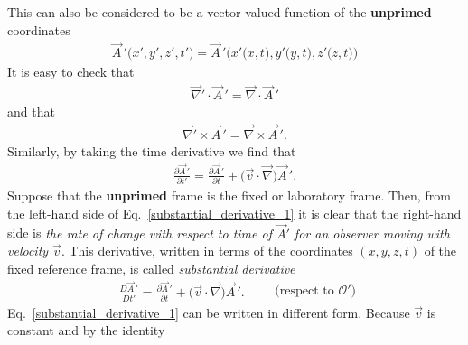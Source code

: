 \documentclass[12pt,a4paper,oneside]{book}
\begin{document}
\begin{onehalfspace}
This can also be considered to be a vector-valued function of the 
\textbf{unprimed} coordinates
\begin{equation*}
	\begin{aligned}
		\vec{A}\,'\big(x',y',z',t'\big) = 	
		\vec{A}\,'\big(x'\big(x,t\big),y'\big(y,t\big),z'\big(z,t\big)\big)
	\end{aligned}
\end{equation*} 
It is easy to check that
\begin{equation}\label{ident1}
	\begin{aligned}
		\vec{\nabla}'\cdot\vec{A}\,' = \vec{\nabla}\cdot\vec{A}\,'
	\end{aligned}
\end{equation} 
and that
\begin{equation}\label{ident2}
	\begin{aligned}
		\vec{\nabla}'\times\vec{A}\,' = \vec{\nabla}\times\vec{A}\,'.
	\end{aligned}
\end{equation} 
Similarly, by taking the time derivative we find that
\begin{equation}\label{substantial_derivative_1}
	\begin{aligned}
		\frac{\partial \vec{A}\,'}{\partial t'} = \frac{\partial 
		\vec{A}\,'}{\partial t} + \big(\vec{v}\cdot\vec{\nabla}\big)\vec{A}\,'.
	\end{aligned}
\end{equation} 
Suppose that the \textbf{unprimed} frame is the fixed or laboratory frame. 
Then, from the left-hand side of Eq.~\ref{substantial_derivative_1} it is clear 
that the right-hand side is \textit{the rate of change with respect to time of 
$\vec{A}'$ for an observer moving with velocity $\vec{v}$}. This derivative, 
written in terms of the coordinates $(x,y,z,t)$ of the fixed reference frame, 
is called \textit{substantial derivative}
\begin{equation}\label{substantial_derivative_2}
	\boxed{	\begin{aligned}
			\frac{D \vec{A}\,'}{D t'} = \frac{\partial \vec{A}\,'}{\partial t} 
			+ \big(\vec{v}\cdot\vec{\nabla}\big)\vec{A}\,'.
	\end{aligned}}\qquad\text{(respect to $\mathcal{O'}$)}
\end{equation} 
Eq.~\ref{substantial_derivative_1} can be written in different form. Because 
$\vec{v}$ is constant and by the identity
\begin{equation}\label{}
	\begin{aligned}

\end{aligned}
\end{equation}
\end{onehalfspace}
\end{document}
